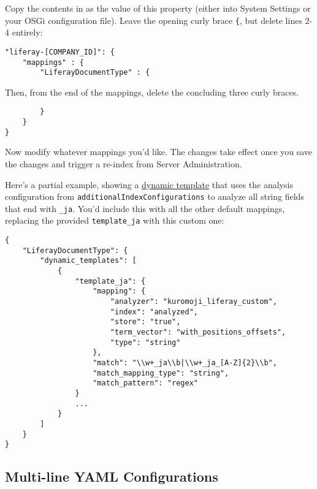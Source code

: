 Copy the contents in as the value of this property (either into System
Settings or your OSGi configuration file). Leave the opening curly brace
\texttt{\{}, but delete lines 2-4 entirely:

\begin{verbatim}
"liferay-[COMPANY_ID]": {
    "mappings" : {
        "LiferayDocumentType" : {
\end{verbatim}

Then, from the end of the mappings, delete the concluding three curly
braces.

\begin{verbatim}
        }
    }
}
\end{verbatim}

Now modify whatever mappings you'd like. The changes take effect once
you save the changes and trigger a re-index from Server Administration.

Here's a partial example, showing a
\href{https://www.elastic.co/guide/en/elasticsearch/reference/6.5/dynamic-templates.html}{dynamic
template} that uses the analysis configuration from
\texttt{additionalIndexConfigurations} to analyze all string fields that
end with \texttt{\_ja}. You'd include this with all the other default
mappings, replacing the provided \texttt{template\_ja} with this custom
one:

\begin{verbatim}
{
    "LiferayDocumentType": {
        "dynamic_templates": [
            {
                "template_ja": {
                    "mapping": {
                        "analyzer": "kuromoji_liferay_custom",
                        "index": "analyzed",
                        "store": "true",
                        "term_vector": "with_positions_offsets",
                        "type": "string"
                    },
                    "match": "\\w+_ja\\b|\\w+_ja_[A-Z]{2}\\b",
                    "match_mapping_type": "string",
                    "match_pattern": "regex"
                }
                ...
            }
        ]
    }
}
\end{verbatim}

\subsection{Multi-line YAML
Configurations}\label{multi-line-yaml-configurations}

